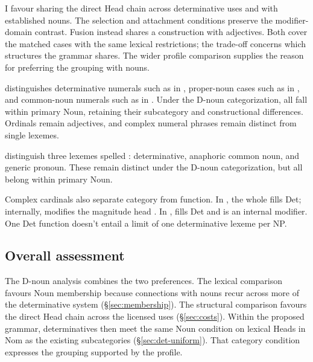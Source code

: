 \documentclass[12pt]{article}
\begin{document}
I favour sharing the direct Head chain across determinative uses and with established nouns. The selection and attachment conditions preserve the modifier-domain contrast. Fusion instead shares a construction with adjectives. Both cover the matched cases with the same lexical restrictions; the trade-off concerns which structures the grammar shares. The wider profile comparison supplies the reason for preferring the grouping with nouns.

\textcite{reynolds2026numerals} distinguishes determinative numerals such as  in , proper-noun cases such as  in , and common-noun numerals such as  in . Under the D-noun categorization, all fall within primary Noun, retaining their subcategory and constructional differences. Ordinals remain adjectives, and complex numeral phrases remain distinct from single lexemes.

\textcite[797--798]{payne2013anaphoric} distinguish three lexemes spelled : determinative, anaphoric common noun, and generic pronoun. These remain distinct under the D-noun categorization, but all belong within primary Noun.

Complex cardinals also separate category from function. In , the whole  fills Det; internally,  modifies the magnitude head  \citep[§4]{reynolds2026numerals}. In ,  fills Det and  is an internal modifier. One Det function doesn't entail a limit of one determinative lexeme per NP.

\subsection{Overall assessment}\label{sec:overall-assessment}

The D-noun analysis combines the two preferences. The lexical comparison favours Noun membership because connections with nouns recur across more of the determinative system (§\ref{sec:membership}). The structural comparison favours the direct Head chain across the licensed uses (§\ref{sec:costs}). Within the proposed grammar, determinatives then meet the same Noun condition on lexical Heads in Nom as the existing subcategories (§\ref{sec:det-uniform}). That category condition expresses the grouping supported by the profile.
\end{document}
